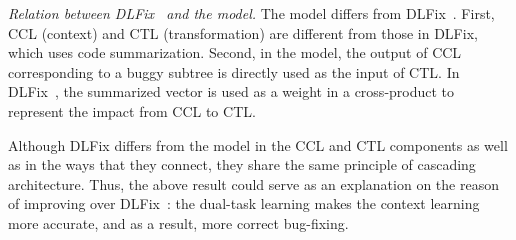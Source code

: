 {\em Relation between DLFix~\cite{icse20} and the 
  model.} The  model differs from
DLFix~\cite{icse20}. First, CCL (context) and CTL (transformation) are
different from those in DLFix, which uses code summarization. Second,
in the  model, the output of CCL corresponding to a
buggy subtree is directly used as the input of CTL. In
DLFix~\cite{icse20}, the summarized vector is used as a weight in a
cross-product to represent the impact from CCL to CTL.

Although DLFix differs from the  model in the CCL and
CTL components as well as in the ways that they connect, they share
the same principle of cascading architecture. Thus, the above result
could serve as an explanation on the reason of {\tool} improving over
DLFix~\cite{icse20}: the dual-task learning makes the context learning
more accurate, and as a result, more correct bug-fixing.







